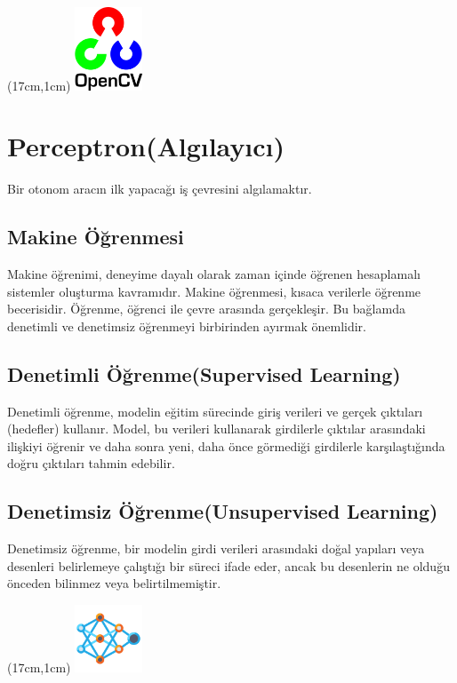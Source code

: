 \documentclass{article}
\begin{document}
\begin{textblock*}{5cm}(17cm,1cm) %
    \includegraphics[width=2cm]{image/Resim17.png} %
\end{textblock*}

\section{Perceptron(Algılayıcı)}
Bir otonom aracın ilk yapacağı iş çevresini algılamaktır. 
\subsection{Makine Öğrenmesi}
Makine öğrenimi, deneyime dayalı olarak zaman içinde öğrenen hesaplamalı sistemler oluşturma kavramıdır.
Makine öğrenmesi, kısaca verilerle öğrenme becerisidir.
Öğrenme, öğrenci ile çevre arasında gerçekleşir. Bu bağlamda denetimli ve denetimsiz öğrenmeyi birbirinden ayırmak önemlidir.
\subsection{Denetimli Öğrenme(Supervised Learning)}
Denetimli öğrenme, modelin eğitim sürecinde giriş verileri ve gerçek çıktıları (hedefler) kullanır. Model, bu verileri kullanarak girdilerle çıktılar arasındaki ilişkiyi öğrenir ve daha sonra yeni, daha önce görmediği girdilerle karşılaştığında doğru çıktıları tahmin edebilir.
\subsection{Denetimsiz Öğrenme(Unsupervised Learning)}
Denetimsiz öğrenme, bir modelin girdi verileri arasındaki doğal yapıları veya desenleri belirlemeye çalıştığı bir süreci ifade eder, ancak bu desenlerin ne olduğu önceden bilinmez veya belirtilmemiştir.

\newpage
\begin{textblock*}{5cm}(17cm,1cm) %
    \includegraphics[width=2cm]{image/sinir.png} %
\end{textblock*}
\end{document}

